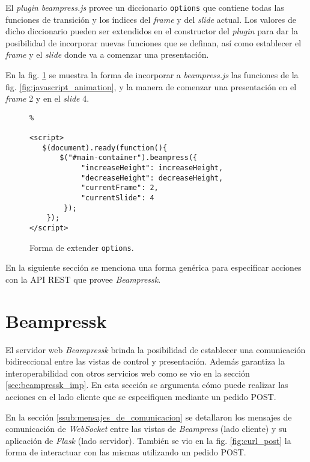 		El \textit{plugin} \textit{beampress.js} provee un diccionario \texttt{options} que contiene todas las funciones de transición y los índices del \textit{frame} y del \textit{slide} actual. Los valores de dicho diccionario pueden ser extendidos en el constructor del \textit{plugin} para dar la posibilidad de incorporar nuevas funciones que se definan, así como establecer el \textit{frame} y el \textit{slide} donde va a comenzar una presentación.

		En la fig. \ref{fig:extending_beampress} se muestra la forma de incorporar a \textit{beampress.js} las funciones de la fig. \ref{fig:javascript_animation}, y la manera de comenzar una presentación en el \textit{frame} 2 y en el \textit{slide} 4. 

		\begin{figure}[htb]%
			\begin{lstlisting}%

<script>
   $(document).ready(function(){ 
       $("#main-container").beampress({
       		"increaseHeight": increaseHeight,
       		"decreaseHeight": decreaseHeight,
       		"currentFrame": 2,
       		"currentSlide": 4
       	});
    });
</script>

			\end{lstlisting}
		\caption{Forma de extender \texttt{options}.} 
		\label{fig:extending_beampress}
		\end{figure}

		En la siguiente sección se menciona una forma genérica para especificar acciones con la API REST que provee \textit{Beampressk}. 

	\section{Beampressk} %
	\label{sec:beampressk_extended}
		El servidor web \textit{Beampressk} brinda la posibilidad de establecer una comunicación bidireccional entre las vistas de control y presentación. Además garantiza la interoperabilidad con otros servicios web como se vio en la sección \ref{sec:beampressk_imp}. En esta sección se argumenta cómo puede realizar las acciones en el lado cliente que se especifiquen mediante un pedido POST.


		En la sección \ref{ssub:mensajes_de_comunicacion} se detallaron los mensajes de comunicación de \textit{WebSocket} entre las vistas de \textit{Beampress} (lado cliente) y su aplicación de \textit{Flask} (lado servidor). También se vio en la fig. \ref{fig:curl_post} la forma de interactuar con las mismas utilizando un pedido POST. 

